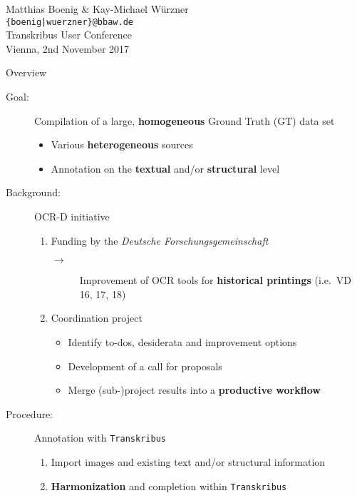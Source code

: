 \documentclass{bbawslides}
\begin{document}
\providecommand{\Title}{}


\begin{bbawtitle}
  \vspace*{0.5em}%
  Matthias Boenig \& Kay-Michael Würzner\\[-.25em]%
  \textcolor{urlColor}{\texttt{{\small \{boenig|wuerzner\}@bbaw.de}}}
  \\[1.5em]
  {\scriptsize{%
    Transkribus User Conference\\%
    Vienna, 2nd November 2017\\%
  }}
\end{bbawtitle}
\slideStyleFrame

\renewcommand{\footerText}{\tiny 2nd November 2017, Transkribus User Conference}

\begin{bbawslide}{Overview}
  \vspace*{7mm}%
  \centerslidestrue%
  \begin{description}
    \item[Goal:] Compilation of a large, \textbf{homogeneous} Ground Truth (GT) data set
    \begin{itemize}\small
      \item Various \textbf{heterogeneous} sources
      \item Annotation on the \textbf{textual} and/or \textbf{structural} level
    \end{itemize}
    \item[Background:] OCR-D initiative
    \begin{enumerate}[label=\alph*.]\small
      \item Funding by the \emph{Deutsche Forschungsgemeinschaft}
      \begin{description}
        \item[$\rightarrow$] Improvement of OCR tools for \textbf{historical printings} (i.e.~VD 16, 17, 18)
      \end{description}
      \item Coordination project
      \begin{itemize}
        \item Identify to-dos, desiderata and improvement options
        \item Development of a call for proposals
        \item Merge (sub-)project results into a \textbf{productive workflow}
      \end{itemize}
    \end{enumerate}
    \item[Procedure:] Annotation with \texttt{Transkribus}
    \begin{enumerate}\small
      \item Import images and existing text and/or structural information
      \item \textbf{Harmonization} and completion within \texttt{Transkribus}
    \end{enumerate}
  \end{description}
\end{bbawslide}
\end{document}
